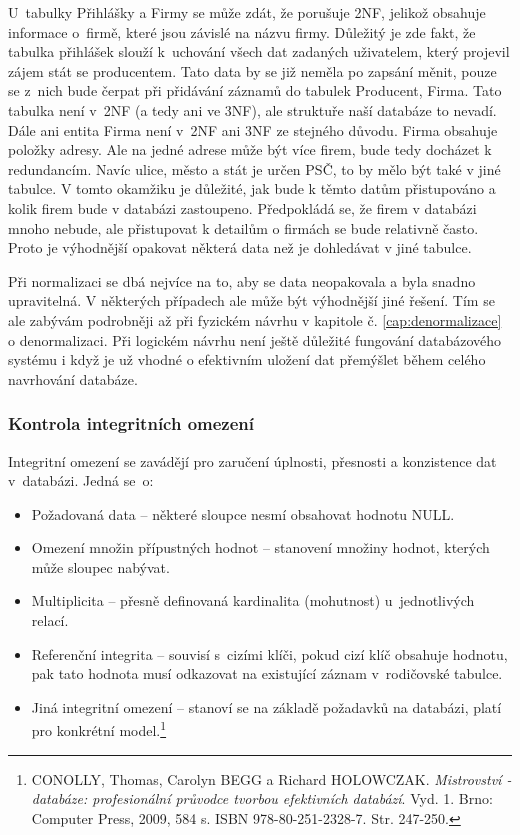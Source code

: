 \documentclass[11pt,a4paper]{article}
\begin{document}
U~tabulky Přihlášky a Firmy se může zdát, že porušuje 2NF, jelikož obsahuje informace o~firmě, které jsou závislé na názvu firmy. Důležitý je zde fakt, že tabulka přihlášek slouží k~uchování všech dat zadaných uživatelem, který projevil zájem stát se producentem. Tato data by se již neměla po zapsání měnit, pouze se z~nich bude čerpat při přidávání záznamů do tabulek Producent, Firma. Tato tabulka není v~2NF (a tedy ani ve 3NF), ale struktuře naší databáze to nevadí. Dále ani entita Firma není v~2NF ani 3NF ze stejného důvodu. Firma obsahuje položky adresy. Ale na jedné adrese může být více firem, bude tedy docházet k redundancím. Navíc ulice, město a stát je určen PSČ, to by mělo být také v jiné tabulce. V tomto okamžiku je důležité, jak bude k těmto datům přistupováno a kolik firem bude v databázi zastoupeno. Předpokládá se, že firem v databázi mnoho nebude, ale přistupovat k detailům o firmách se bude relativně často. Proto je výhodnější opakovat některá data než je dohledávat v jiné tabulce.

Při normalizaci se dbá nejvíce na to, aby se data neopakovala a byla snadno upravitelná. V některých případech ale může být výhodnější jiné řešení. Tím se ale zabývám podrobněji až při fyzickém návrhu v kapitole č. \ref{cap:denormalizace} o denormalizaci. Při logickém návrhu není ještě důležité fungování databázového systému i když je už vhodné o efektivním uložení dat přemýšlet během celého navrhování databáze.
\newpage

\subsubsection{Kontrola integritních omezení}
Integritní omezení se zavádějí pro zaručení úplnosti, přesnosti a konzistence dat v~databázi. Jedná se~o:
\begin{itemize}
\item Požadovaná data – některé sloupce nesmí obsahovat hodnotu NULL.
\item Omezení množin přípustných hodnot – stanovení množiny hodnot, kterých může sloupec nabývat.
\item Multiplicita – přesně definovaná kardinalita (mohutnost) u~jednotlivých relací.
\item Referenční integrita – souvisí s~cizími klíči, pokud cizí klíč obsahuje hodnotu, pak tato hodnota musí odkazovat na existující záznam v~rodičovské tabulce.
\item Jiná integritní omezení – stanoví se na základě požadavků na databázi, platí pro konkrétní model.\footnote{CONOLLY, Thomas, Carolyn BEGG a Richard HOLOWCZAK. \textit{Mistrovství - databáze: profesionální průvodce tvorbou efektivních databází}. Vyd. 1. Brno: Computer Press, 2009, 584 s. ISBN 978-80-251-2328-7. Str. 247-250.}
\end{itemize}
\end{document}
